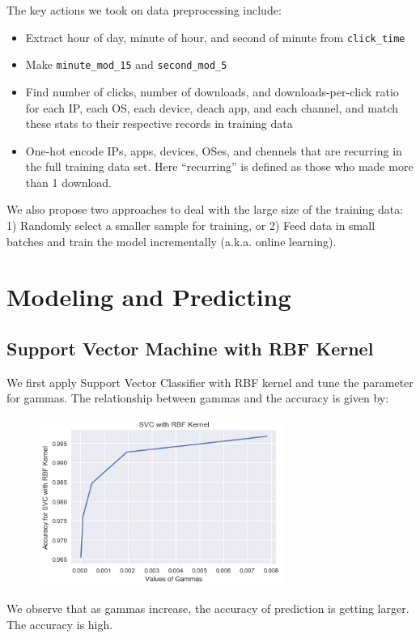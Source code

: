 \documentclass[12pt]{article}
\begin{document}
The key actions we took on data preprocessing include:
\begin{itemize}
    \item Extract hour of day, minute of hour, and second of minute from \texttt{click\_time}
    \item Make \texttt{minute\_mod\_15} and \texttt{second\_mod\_5}
    \item Find number of clicks, number of downloads, and downloads-per-click ratio for each IP, each OS, each device, deach app, and each channel, and match these stats to their respective records in training data
    \item One-hot encode IPs, apps, devices, OSes, and chennels that are recurring in the full training data set. Here ``recurring'' is defined as those who made more than 1 download.
\end{itemize}

We also propose two approaches to deal with the large size of the training data: 1) Randomly select a smaller sample for training, or 2) Feed data in small batches and train the model incrementally (a.k.a. online learning).

\section{Modeling and Predicting}

\subsection{Support Vector Machine with RBF Kernel}
We first apply Support Vector Classifier with RBF kernel and tune the parameter for gammas. The relationship between gammas and the accuracy is given by:
\begin{figure}[H]
    \centering
    \includegraphics[width=8cm]{img/SVC_RBF/RBF_SVM.png}
\end{figure}
We observe that as gammas increase, the accuracy of prediction is getting larger. The accuracy is high. 
\end{document}
